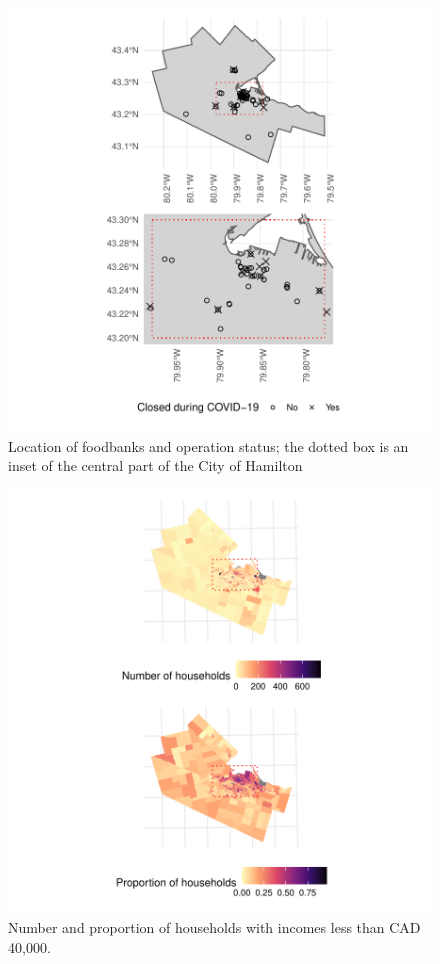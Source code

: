\documentclass[]{elsarticle} %
\begin{document}
\begin{figure}
\includegraphics[width=1\linewidth]{Accessibility-Foodbanks-Hamilton_files/figure-latex/plot-location-foodbanks-1} \caption{\label{fig:foodbanks}Location of foodbanks and operation status; the dotted box is an inset of the central part of the City of Hamilton}\label{fig:plot-location-foodbanks}
\end{figure}
\begin{figure}
\includegraphics[width=1\linewidth]{Accessibility-Foodbanks-Hamilton_files/figure-latex/plot-low-income-households-1} \caption{\label{fig:low-income-households}Number and proportion of households with incomes less than CAD 40,000.}\label{fig:plot-low-income-households}
\end{figure}
\end{document}
